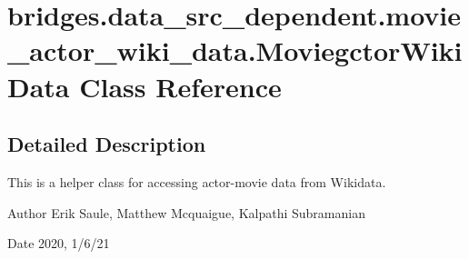 \hypertarget{classbridges_1_1data__src__dependent_1_1movie__actor__wiki__data_1_1_moviegctor_wiki_data}{}\section{bridges.\+data\+\_\+src\+\_\+dependent.\+movie\+\_\+actor\+\_\+wiki\+\_\+data.\+Moviegctor\+Wiki\+Data Class Reference}
\label{classbridges_1_1data__src__dependent_1_1movie__actor__wiki__data_1_1_moviegctor_wiki_data}


\subsection{Detailed Description}
This is a helper class for accessing actor-\/movie data from Wikidata. 

\begin{DoxyAuthor}{Author}
Erik Saule, Matthew Mcquaigue, Kalpathi Subramanian 
\end{DoxyAuthor}
\begin{DoxyDate}{Date}
2020, 1/6/21 
\end{DoxyDate}
